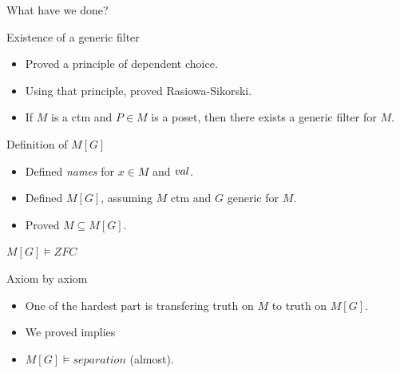 \documentclass{beamer}
\begin{document}
\begin{frame}{What have we done?}
  \begin{block}{Existence of a generic filter}
  \begin{itemize}
  \item Proved a principle of dependent choice.
  \item Using that principle, proved Rasiowa-Sikorski.
  \item If $M$ is a ctm and $P\in M$ is a poset, then
    there exists a generic filter for $M$.
  \end{itemize}
\end{block}
\begin{block}{Definition of $M[G]$}
  \begin{itemize}
  \item Defined \emph{names} for $x \in M$ and \emph{$\operatorname{\mathit{val}}$}.
  \item Defined $M[G]$, assuming $M$ ctm and $G$ generic for $M$.
  \item Proved $M \subseteq M[G]$.%
\end{itemize}
\end{block}
\end{frame}

\begin{frame}{$M[G] \models ZFC$}
  \begin{block}{Axiom by axiom}
    \begin{itemize}
    \item One of the hardest part is transfering truth on $M$ to
      truth on $M[G]$.
    \item We proved  implies 
    \item $M[G]\models \mathit{separation}$ (almost).
    \end{itemize}
  \end{block}
\end{frame}
\end{document}
